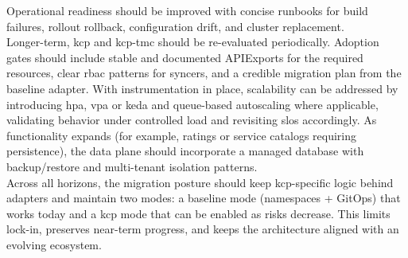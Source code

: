 \documentclass[11pt, a4paper, oneside, listof=totoc]{scrartcl}
\begin{document}
            Operational readiness should be improved with concise runbooks for build failures,
            rollout rollback, configuration drift, and cluster replacement.\\
            Longer-term, \gls{kcp} and \gls{kcp}-\gls{tmc} should be re-evaluated periodically.
            Adoption gates should include stable and documented APIExports for the required
            resources, clear \gls{rbac} patterns for syncers, and a credible migration plan from the
            baseline adapter.
            With instrumentation in place, scalability can be addressed by introducing \gls{hpa},
            \gls{vpa} or \gls{keda} and queue-based autoscaling where applicable, validating
            behavior under controlled load and revisiting \glspl{slo} accordingly.
            As functionality expands (for example, ratings or service catalogs requiring
            persistence), the data plane should incorporate a managed database with backup/restore
            and multi-tenant isolation patterns.\\
            Across all horizons, the migration posture should keep \gls{kcp}-specific logic behind
            adapters and maintain two modes: a baseline mode (namespaces + GitOps) that works today
            and a \gls{kcp} mode that can be enabled as risks decrease.
            This limits lock-in, preserves near-term progress, and keeps the architecture aligned
            with an evolving ecosystem.

    \cleardoublepage
    \printbibliography[
        title = {References},
        heading = bibintoc
    ]

    \cleardoublepage
    \appendix

\end{document}
